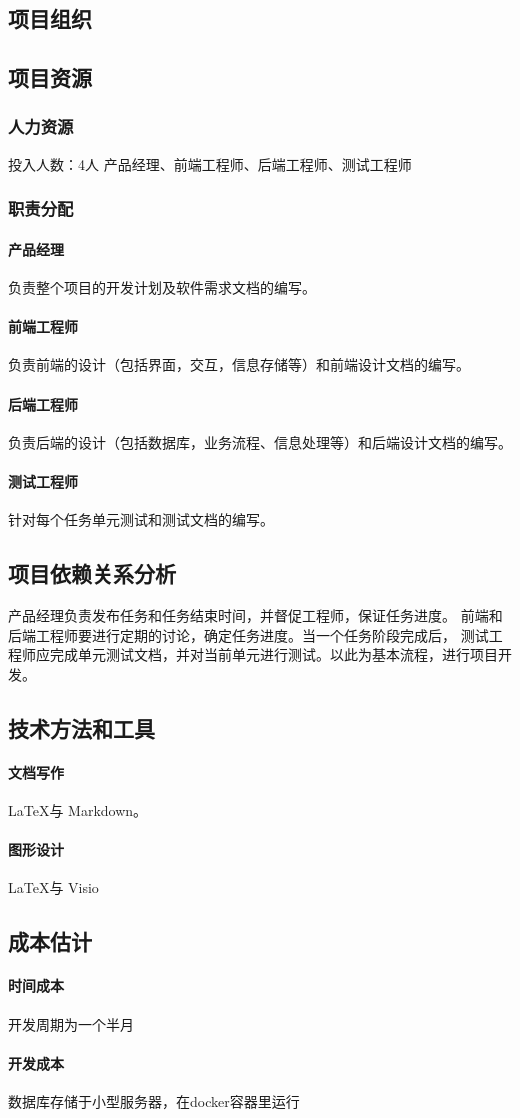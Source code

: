 \documentclass[UTF8]{dingo}
\begin{document}
    \subsection{项目组织}
    \subsection{项目资源}
      \subsubsection{人力资源}
        投入人数：4人
        产品经理、前端工程师、后端工程师、测试工程师
      \subsubsection{职责分配}
        \paragraph{产品经理} 负责整个项目的开发计划及软件需求文档的编写。
        \paragraph{前端工程师} 负责前端的设计（包括界面，交互，信息存储等）和前端设计文档的编写。
        \paragraph{后端工程师} 负责后端的设计（包括数据库，业务流程、信息处理等）和后端设计文档的编写。
        \paragraph{测试工程师} 针对每个任务单元测试和测试文档的编写。
    \subsection{项目依赖关系分析}
      产品经理负责发布任务和任务结束时间，并督促工程师，保证任务进度。
      前端和后端工程师要进行定期的讨论，确定任务进度。当一个任务阶段完成后，
      测试工程师应完成单元测试文档，并对当前单元进行测试。以此为基本流程，进行项目开发。

    \subsection{技术方法和工具}
      \paragraph{文档写作} \LaTeX 与 Markdown。
      \paragraph{图形设计} \LaTeX 与 Visio
    \subsection{成本估计}
      \paragraph{时间成本} 开发周期为一个半月
      \paragraph{开发成本} 数据库存储于小型服务器，在docker容器里运行
\end{document}
